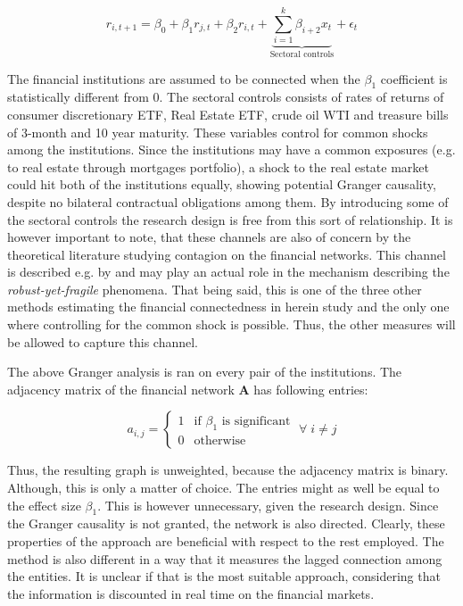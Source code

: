 \documentclass[12pt]{article}
\begin{document}
\begin{equation}\label{equation:granger}
	r_{i,t+1} = \beta_0 + \beta_1 r_{j,t} + \beta_2 r_{i, t} + \underbrace{\sum_{i=1}^{k} \beta_{i+2} x_{t}}_{\text{Sectoral controls}} + \epsilon_t
\end{equation}

The financial institutions are assumed to be connected when the $\beta_1$ coefficient is statistically different from 0. The sectoral controls consists of rates of returns of consumer discretionary ETF, Real Estate ETF, crude oil WTI and treasure bills of 3-month and 10 year maturity. These variables control for common shocks among the institutions. Since the institutions may have a common exposures (e.g. to real estate through mortgages portfolio), a shock to the real estate market could hit both of the institutions equally, showing potential Granger causality, despite no bilateral contractual obligations among them. By introducing some of the sectoral controls the research design is free from this sort of relationship. It is however important to note, that these channels are also of concern by the theoretical literature studying contagion on the financial networks. This channel is described e.g. by \cite{cifuentes05} and may play an actual role in the mechanism describing the \textit{robust-yet-fragile} phenomena. That being said, this is one of the three other methods estimating the financial connectedness in herein study and the only one where controlling for the common shock is possible. Thus, the other measures will be allowed to capture this channel. 

The above Granger analysis is ran on every pair of the institutions. The adjacency matrix of the financial network $\boldsymbol{A}$ has following entries:

\begin{equation}
	a_{i,j} = \begin{cases}
		1  & \text{if } \beta_1 \text{ is significant} \\
		0 & \text{otherwise}
	\end{cases} \; \forall \; i \neq j
\end{equation}

Thus, the resulting graph is unweighted, because the adjacency matrix is binary. Although, this is only a matter of choice. The entries might as well be equal to the effect size $\beta_1$. This is however unnecessary, given the research design. Since the Granger causality is not granted, the network is also directed. Clearly, these properties of the approach are beneficial with respect to the rest employed. The method is also different in a way that it measures the lagged connection among the entities. It is unclear if that is the most suitable approach, considering that the information is discounted in real time on the financial markets. 
\end{document}
